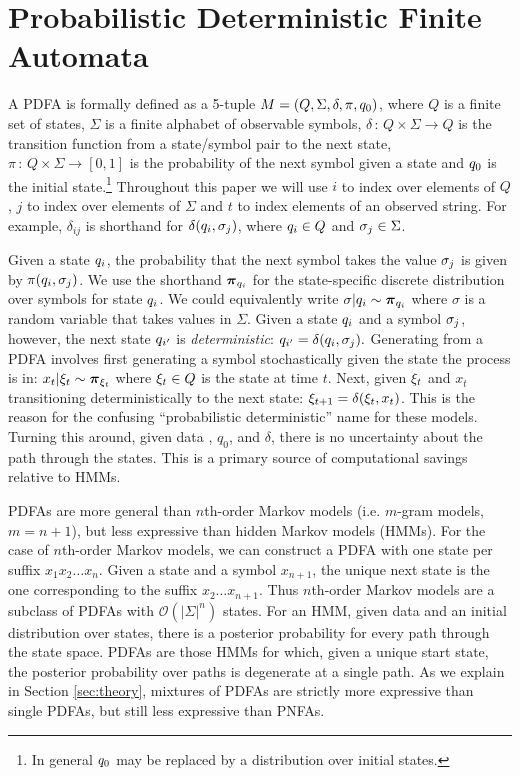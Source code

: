 \section{Probabilistic Deterministic Finite Automata}
\label{sec:PDFA}

A PDFA is formally defined as a 5-tuple $M = (Q,\Sigma,\delta,\pi,\state_0)$, where $Q$ is a finite set of states, $\Sigma$ is a finite alphabet of observable symbols, $\delta\,:\,Q\times\Sigma\rightarrow Q$ is the transition function from a state/symbol pair to the next state, $\pi\,:\,Q\times\Sigma\rightarrow[0,1]$ is the probability of the next symbol given a state and $\state_0$ is the initial state.\footnote{In general $\state_0$ may be replaced by a distribution over initial states.  }  Throughout this paper we will use $i$ to index over elements of $Q$, $j$ to index over elements of $\Sigma$ and $t$ to index elements of an observed string.  For example, $\delta_{ij}$ is shorthand for $\delta(\state_i,\symb_j)$, where $\state_i \in Q$ and $\symb_j \in \Sigma$.

Given a state $\state_i$, the probability that the next symbol takes the value $\symb_j$ is given by $\pi(\state_i,\symb_j)$.  We use the shorthand $\bpi_{q_i}$ for the state-specific discrete distribution over symbols for state $\state_i$.  We could equivalently write $\sigma|\state_i \sim \bpi_{q_i}$ where $\sigma$ is a random variable that takes values in $\Sigma$.  Given a state $\state_i$ and a symbol $\symb_j$, however, the next state $\state_{i'}$ is {\it deterministic}: $\state_{i'} = \delta(\state_i,\symb_j).$   Generating from a PDFA involves first generating a symbol stochastically given the state the process is in: $x_t|\q_t \sim \bpi_{\q_t}$ where $\q_t \in Q$ is the state at time $t$.  Next, given $\q_t$ and $x_t$ transitioning deterministically to the next state: $\q_{t+1} = \delta(\q_t,x_t)$.  This is the reason for the confusing ``probabilistic deterministic'' name for these models.  Turning this around, given data , $q_0$, and $\delta$, there is no uncertainty about the path through the states.  This is a primary source of computational savings relative to HMMs.

PDFAs are more general than $n$th-order Markov models (i.e. $m$-gram models, $m=n+1$), but less expressive than hidden Markov models (HMMs)\cite{Dupont2005}.  For the case of $n$th-order Markov models, we can construct a PDFA with one state per suffix $x_1 x_2 \ldots x_n$.  Given a state and a symbol $x_{n+1}$, the unique next state is the one corresponding to the suffix $x_2 \ldots x_{n+1}$.  Thus $n$th-order Markov models are a subclass of PDFAs with $\mathcal{O}(|\Sigma|^n)$ states.  For an HMM, given data and an initial distribution over states, there is a posterior probability for every path through the state space.  PDFAs are those HMMs for which, given a unique start state, the posterior probability over paths is degenerate at a single path.  As we explain in Section \ref{sec:theory}, mixtures of PDFAs are strictly more expressive than single PDFAs, but still less expressive than PNFAs.